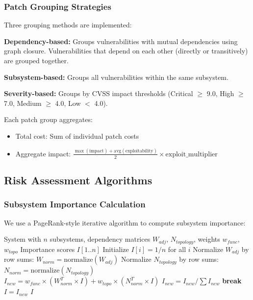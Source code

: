 \documentclass[conference]{IEEEtran}
\begin{document}
\subsubsection{Patch Grouping Strategies}
Three grouping methods are implemented:

\textbf{Dependency-based:} Groups vulnerabilities with mutual dependencies using graph closure. Vulnerabilities that depend on each other (directly or transitively) are grouped together.

\textbf{Subsystem-based:} Groups all vulnerabilities within the same subsystem.

\textbf{Severity-based:} Groups by CVSS impact thresholds (Critical $\geq$ 9.0, High $\geq$ 7.0, Medium $\geq$ 4.0, Low $<$ 4.0).

Each patch group aggregates:
\begin{itemize}
    \item Total cost: Sum of individual patch costs
    \item Aggregate impact: $\frac{\max(\text{impact}) + \text{avg}(\text{exploitability})}{2} \times \text{exploit\_multiplier}$
\end{itemize}

\subsection{Risk Assessment Algorithms}

\subsubsection{Subsystem Importance Calculation}
We use a PageRank-style iterative algorithm to compute subsystem importance:

\begin{algorithm}
\caption{Subsystem Importance Calculation}
\begin{algorithmic}[1]
\REQUIRE System with $n$ subsystems, dependency matrices $W_{adj}$, $N_{topology}$, weights $w_{func}$, $w_{topo}$
\ENSURE Importance scores $I[1..n]$
\STATE Initialize $I[i] = 1/n$ for all $i$
\STATE Normalize $W_{adj}$ by row sums: $W_{norm} = \text{normalize}(W_{adj})$
\STATE Normalize $N_{topology}$ by row sums: $N_{norm} = \text{normalize}(N_{topology})$
    \STATE $I_{new} = w_{func} \times (W_{norm}^T \times I) + w_{topo} \times (N_{norm}^T \times I)$
    \STATE $I_{new} = I_{new} / \sum I_{new}$ 
        \STATE \textbf{break}
    \ENDIF
    \STATE $I = I_{new}$
\ENDFOR
\RETURN $I$
\end{algorithmic}
\end{algorithm}
\end{document}
